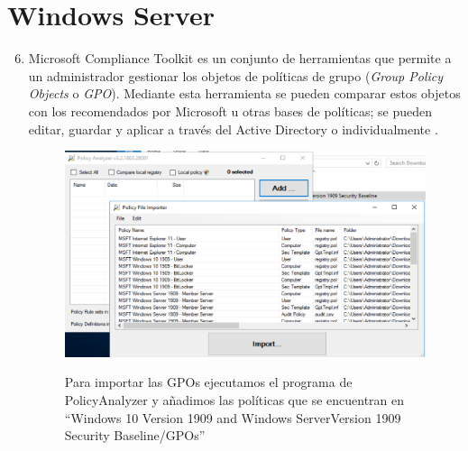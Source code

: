 \documentclass[10pt,a4paper]{article}
\begin{document}
\section{Windows Server}
\begin{enumerate}[label=\textbf{\alph*)}]
\setcounter{enumi}{5}
\item %
Microsoft Compliance Toolkit es un conjunto de herramientas que permite a un administrador gestionar los objetos de políticas de grupo (\textit{Group Policy Objects} o \textit{GPO}). Mediante esta herramienta se pueden comparar estos objetos con los recomendados por Microsoft u otras bases de políticas; se pueden editar, guardar y aplicar a través del Active Directory o individualmente \cite{SCT}.
\\
\begin{figure}[h!]
  \centering
  \includegraphics[scale=0.2]{f.png}\\
  \caption{Para importar las GPOs ejecutamos el programa de PolicyAnalyzer y añadimos las políticas que se encuentran en ``Windows 10 Version 1909 and Windows ServerVersion 1909 Security Baseline/GPOs''}
  \label{fig:gpos}
\end{figure}


\end{enumerate}
\end{document}
